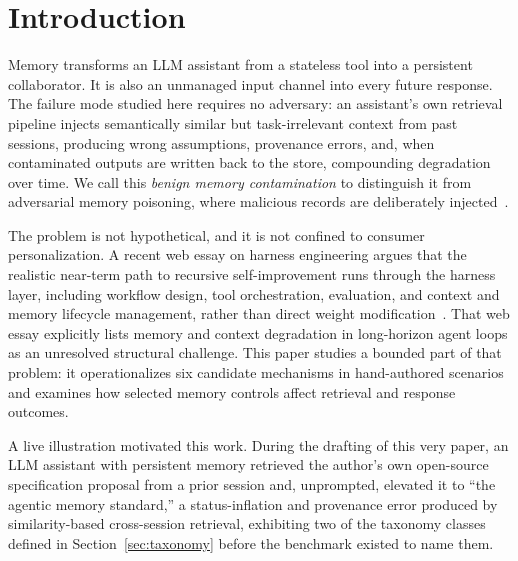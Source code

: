 \documentclass[11pt]{article}
\begin{document}
\section{Introduction}
\label{sec:intro}

Memory transforms an LLM assistant from a stateless tool into a persistent
collaborator. It is also an unmanaged input channel into every future
response. The failure mode studied here requires no adversary: an
assistant's own retrieval pipeline injects semantically similar but
task-irrelevant context from past sessions, producing wrong assumptions,
provenance errors, and, when contaminated outputs are written back to the
store, compounding degradation over time. We call this \emph{benign
memory contamination} to distinguish it from adversarial memory poisoning,
where malicious records are deliberately injected~\cite{chen2024agentpoison,
dong2025minja}.

The problem is not hypothetical, and it is not confined to consumer
personalization. A recent web essay on harness engineering argues that the
realistic near-term path to recursive self-improvement runs through the
harness layer, including workflow design, tool orchestration, evaluation, and
context and memory lifecycle management, rather than direct
weight modification~\cite{weng2026harness}. That web essay explicitly lists
memory and context degradation in long-horizon agent loops as an unresolved
structural challenge. This paper studies a bounded part of that problem:
it operationalizes six candidate mechanisms in hand-authored scenarios and
examines how selected memory controls affect retrieval and response outcomes.

A live illustration motivated this work. During the drafting of this very
paper, an LLM assistant with persistent memory retrieved the author's own
open-source specification proposal from a prior session and, unprompted,
elevated it to ``the agentic memory standard,'' a status-inflation and
provenance error produced by similarity-based cross-session retrieval,
exhibiting two of the taxonomy classes defined in
Section~\ref{sec:taxonomy} before the benchmark existed to name them.
\end{document}
